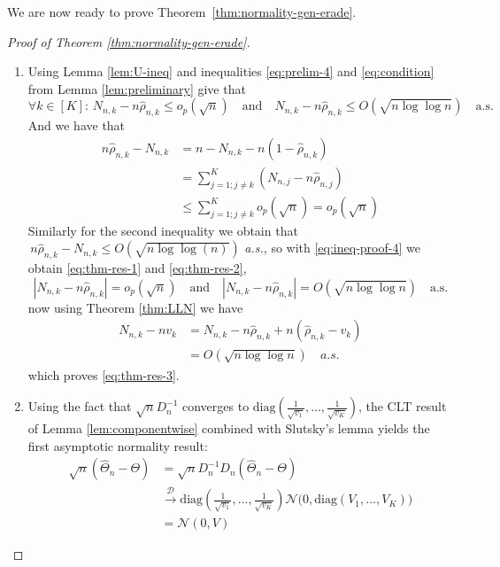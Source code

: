 We are now ready to prove Theorem~\ref{thm:normality-gen-erade}.

\begin{proof}[Proof of Theorem \ref{thm:normality-gen-erade}]
	\begin{enumerate}[label=(\roman*)]
		\item Using Lemma \ref{lem:U-ineq} and inequalities \eqref{eq:prelim-4} and \eqref{eq:condition} from Lemma \ref{lem:preliminary} give that	
		\begin{equation}\label{eq:ineq-proof-4}
			\forall k \in [K]: \, N_{n,k} - n\hat{\rho}_{n,k} \leq o_p(\sqrt{n}) \quad \text{and} \quad N_{n,k} - n\hat{\rho}_{n,k} \leq O(\sqrt{n \log \log n}) \quad \text{a.s.}
		\end{equation}
		And we have that 
		\begin{align*}
			n\hat{\rho}_{n,k} - N_{n,k} &= n - N_{n,k} - n (1 - \hat{\rho}_{n,k})\\
			&= \sum_{j=1; j\neq k}^{K} \left(N_{n,j} - n \hat\rho_{n,j}\right)\\
			&\leq \sum_{j=1; j\neq k}^{K} o_p(\sqrt{n}) = o_p(\sqrt{n}) 
		\end{align*}
		Similarly for the second inequality we obtain that
		 \(\,n\hat{\rho}_{n,k} - N_{n,k} \leq O\left(\!\sqrt{n \log\!\log(n)}\right)\) \textit{a.s.}, so with \eqref{eq:ineq-proof-4} we obtain \eqref{eq:thm-res-1} and \eqref{eq:thm-res-2},
		\[
		|N_{n,k} - n\hat{\rho}_{n,k}| = o_p(\sqrt{n}) \quad \text{and} \quad  |N_{n,k} - n\hat{\rho}_{n,k}| = O(\sqrt{n \log\!\log n}) \quad \text{a.s.}
		\]
		now using Theorem \ref{thm:LLN} we have
		\begin{align*}
			N_{n,k} - n v_k &= N_{n,k} - n \hat{\rho}_{n,k} + n(\hat{\rho}_{n,k} - v_k)\\
			&= O(\sqrt{n \log \log n}) \quad a.s.
		\end{align*}
		which proves \eqref{eq:thm-res-3}.

		\item Using the fact that \(\sqrt n D_n^{-1}\) converges to \(\mathrm{diag}\left(\frac{1}{\sqrt{v_1}},\ldots,\frac{1}{\sqrt{v_K}}\right)\), the CLT result of Lemma \ref{lem:componentwise} combined with Slutsky's lemma yields the first asymptotic normality result:
		\begin{align*}
			\sqrt n(\hat\Theta_n-\Theta) &= \sqrt n D_n^{-1} D_n(\hat\Theta_n-\Theta)\\
			&\xrightarrow{\mathcal{D}}\mathrm{diag}\left(\frac{1}{\sqrt{v_1}},\ldots,\frac{1}{\sqrt{v_K}}\right) \mathcal N\!\big(0,\mathrm{diag}\left(V_1,\dots,V_K\right)\big)\\
			&= \mathcal N(0,V) 
		\end{align*}
		

\end{enumerate}
\end{proof}
